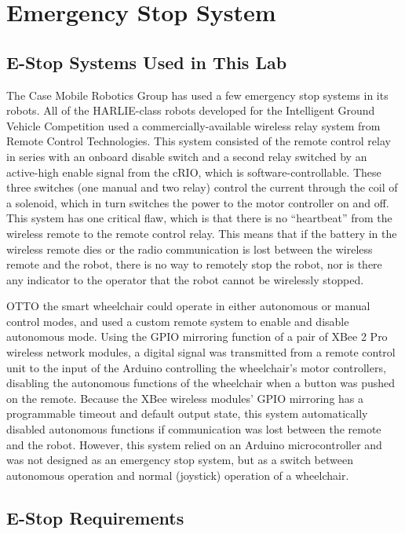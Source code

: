 \documentclass[]{cwru} %
\begin{document}
\section{Emergency Stop System}
\label{estop}

\subsection{E-Stop Systems Used in This Lab}

The Case Mobile Robotics Group has used a few emergency stop systems in
its robots. All of the HARLIE-class robots developed for the Intelligent
Ground Vehicle Competition used a commercially-available wireless relay
system from Remote Control Technologies. This system consisted of the
remote control relay in series with an onboard disable switch and a
second relay switched by an active-high enable signal from the cRIO,
which is software-controllable. These three switches (one manual and two
relay) control the current through the coil of a solenoid, which in turn
switches the power to the motor controller on and off. This system has
one critical flaw, which is that there is no ``heartbeat'' from the
wireless remote to the remote control relay. This means that if the
battery in the wireless remote dies or the radio communication is lost
between the wireless remote and the robot, there is no way to remotely
stop the robot, nor is there any indicator to the operator that the
robot cannot be wirelessly stopped.

OTTO the smart wheelchair could operate in either autonomous or manual
control modes, and used a custom remote system to enable and disable
autonomous mode. Using the GPIO mirroring function of a pair of XBee 2
Pro wireless network modules, a digital signal was transmitted from a
remote control unit to the input of the Arduino controlling the
wheelchair's motor controllers, disabling the autonomous functions of
the wheelchair when a button was pushed on the remote. Because the XBee
wireless modules' GPIO mirroring has a programmable timeout and default
output state, this system automatically disabled autonomous functions if
communication was lost between the remote and the robot. However, this
system relied on an Arduino microcontroller and was not designed as an
emergency stop system, but as a switch between autonomous operation and
normal (joystick) operation of a wheelchair.

\subsection{E-Stop Requirements}
\end{document}
